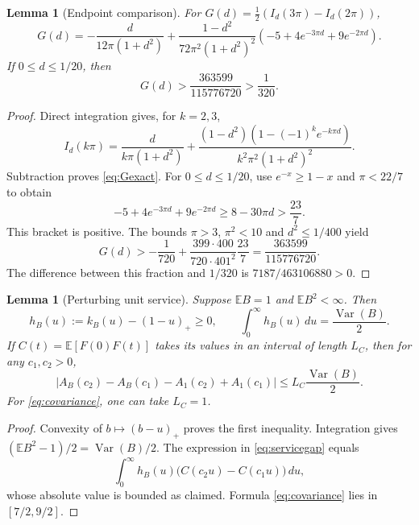 \documentclass[aap,preprint]{imsart}
\numberwithin{equation}{section}
\theoremstyle{plain}
\newtheorem{lemma}[theorem]{Lemma}
\theoremstyle{definition}
\newcommand{\E}{\mathbb E}
\newcommand{\1}{\mathbf 1}
\DeclareMathOperator{\Var}{Var}
\begin{document}
\begin{lemma}[Endpoint comparison]\label{lem:endpointgap}
For $G(d)=\tfrac12(I_d(3\pi)-I_d(2\pi))$,
\begin{equation}\label{eq:Gexact}
 G(d)=-\frac{d}{12\pi(1+d^2)}
 +\frac{1-d^2}{72\pi^2(1+d^2)^2}
 \left(-5+4e^{-3\pi d}+9e^{-2\pi d}\right).
\end{equation}
If $0\le d\le1/20$, then
\begin{equation}\label{eq:Gbound}
 G(d)>\frac{363599}{115776720}>\frac1{320}.
\end{equation}
\end{lemma}
\begin{proof}
Direct integration gives, for $k=2,3$,
\[
 I_d(k\pi)=\frac{d}{k\pi(1+d^2)}
 +\frac{(1-d^2)(1-(-1)^ke^{-k\pi d})}{k^2\pi^2(1+d^2)^2}.
\]
Subtraction proves \eqref{eq:Gexact}. For $0\le d\le1/20$, use $e^{-x}\ge1-x$ and $\pi<22/7$ to obtain
\[
 -5+4e^{-3\pi d}+9e^{-2\pi d}\ge8-30\pi d>\frac{23}{7}.
\]
This bracket is positive. The bounds $\pi>3$, $\pi^2<10$ and $d^2\le1/400$ yield
\[
 G(d)>-\frac1{720}
 +\frac{399\cdot400}{720\cdot401^2}\frac{23}{7}
 =\frac{363599}{115776720}.
\]
The difference between this fraction and $1/320$ is $7187/463106880>0$.
\end{proof}

\begin{lemma}[Perturbing unit service]\label{lem:service}
Suppose $\E B=1$ and $\E B^2<\infty$. Then
\begin{equation}\label{eq:kernelmass}
 h_B(u):=k_B(u)-(1-u)_+\ge0,
 \qquad \int_0^\infty h_B(u)\,du=\frac{\Var(B)}2.
\end{equation}
If $C(t)=\E[F(0)F(t)]$ takes its values in an interval of length $L_C$, then for any $c_1,c_2>0$,
\begin{equation}\label{eq:servicegap}
 \left|A_B(c_2)-A_B(c_1)-A_1(c_2)+A_1(c_1)\right|
 \le L_C\frac{\Var(B)}2.
\end{equation}
For \eqref{eq:covariance}, one can take $L_C=1$.
\end{lemma}
\begin{proof}
Convexity of $b\mapsto(b-u)_+$ proves the first inequality. Integration gives $(\E B^2-1)/2=\Var(B)/2$. The expression in \eqref{eq:servicegap} equals
\[
 \int_0^\infty h_B(u)\bigl(C(c_2u)-C(c_1u)\bigr)\,du,
\]
whose absolute value is bounded as claimed. Formula \eqref{eq:covariance} lies in $[7/2,9/2]$.
\end{proof}
\end{document}
